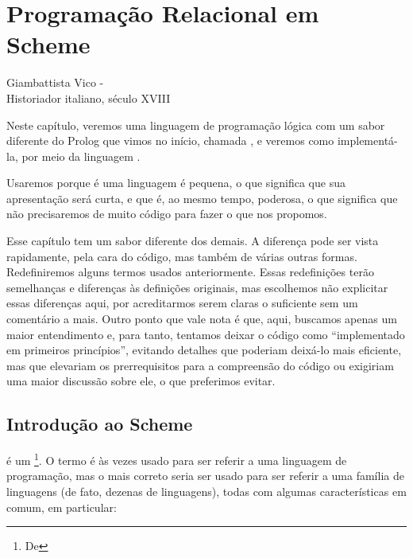 \documentclass{article}
\begin{document}
\section{Programação Relacional em Scheme}

\epigraph{}{Giambattista Vico - \\Historiador italiano, século XVIII}


Neste capítulo, veremos uma linguagem de programação lógica com um
sabor diferente do Prolog que vimos no início, chamada
, e veremos como implementá-la, por meio da
linguagem .

Usaremos  porque é uma linguagem é pequena, o
que significa que sua apresentação será curta, e que é, ao mesmo
tempo, poderosa, o que significa que não precisaremos de muito código
para fazer o que nos propomos.

Esse capítulo tem um sabor diferente dos demais. A diferença pode ser vista
rapidamente, pela cara do código, mas também de várias outras
formas. Redefiniremos alguns termos usados anteriormente. Essas
redefinições terão semelhanças e diferenças às definições originais,
mas escolhemos não explicitar essas diferenças aqui, por acreditarmos serem
claras o suficiente sem um comentário a mais. Outro ponto que vale nota é que, aqui, buscamos
apenas um maior entendimento e, para tanto, tentamos deixar o código
como ``implementado em primeiros princípios'', evitando detalhes que
poderiam deixá-lo mais eficiente, mas que elevariam os prerrequisitos para
a compreensão do código ou exigiriam uma maior discussão sobre
ele, o que preferimos evitar.

\subsection{Introdução ao Scheme}

 é um \footnote{De
  }. O termo  é às vezes
usado para ser referir a uma linguagem de programação, mas o mais
correto seria ser usado para ser referir a uma família de linguagens (de fato,
dezenas de linguagens), todas com algumas características em comum,
em particular:
\end{document}
